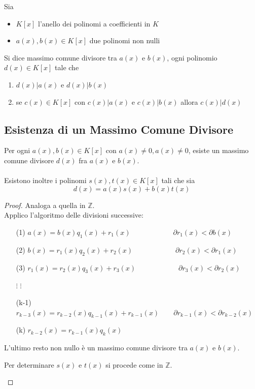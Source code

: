 \documentclass[a4paper,12pt, oneside]{book}
\begin{document}
		\begin{definizione}
			Sia 
			\begin{itemize}
				\item $K[x]$ l'anello dei polinomi a coefficienti in $K$
				\item $a(x), b(x) \in K[x]$ due polinomi non nulli
			\end{itemize}
			Si dice massimo comune divisore tra $a(x)$ e $b(x)$, ogni polinomio $d(x) \in K[x]$ tale che
			\begin{enumerate}
				\item $d(x) | a(x)$ e $d(x) | b(x)$
				\item se $c(x) \in K[x]$ con $c(x) | a(x)$ e $c(x) | b(x)$ allora $c(x) | d(x)$ 
			\end{enumerate}
		\end{definizione}
		
		\subsection{Esistenza di un Massimo Comune Divisore}
			\begin{teorema}
				Per ogni $a(x), b(x) \in K[x]$ con $a(x) \not = 0, a(x) \not = 0$, esiste un massimo comune divisore $d(x)$ fra $a(x)$ e $b(x)$.\\\\
				Esistono inoltre i polinomi $s(x), t(x) \in K[x]$ tali che sia
				$$d(x) = a(x) s(x) + b(x) t(x)$$ 
				
				\begin{proof}
					Analoga a quella in $\mathbb{Z}$.\\
					Applico l'algoritmo delle divisioni successive:\\
					\begin{enumerate}
						\item[(1)] $a(x) = b(x) q_1(x) + r_1(x) \qquad \qquad \qquad \partial r_1(x) < \partial b(x)$
						\item[(2)] $b(x) = r_1(x) q_2(x) + r_2(x) \qquad \qquad \qquad \partial r_2(x) < \partial r_1(x)$
						\item[(3)] $r_1(x) = r_2(x) q_3(x) + r_3(x) \qquad \qquad \qquad \partial r_3(x) < \partial r_2(x)$
						\item[$\vdots$] $\vdots$
						\item[(k-1)] $r_{k-3}(x) = r_{k-2}(x) q_{k-1}(x) + r_{k-1}(x) \qquad \partial r_{k-1}(x) < \partial r_{k-2}(x)$
						\item[(k)] $r_{k-2}(x) = r_{k-1}(x) q_k(x)$
					\end{enumerate}
					L'ultimo resto non nullo è un massimo comune divisore tra $a(x)$ e $b(x)$.
					\begin{nota}
						Per determinare $s(x)$ e $t(x)$ si procede come in $\mathbb{Z}$.
					\end{nota}
				\end{proof}
			\end{teorema}
			
\end{document}
